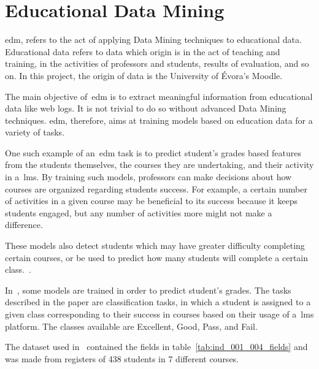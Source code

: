 \section{Educational Data Mining}

\acrfull{edm}, refers to the act of applying Data Mining techniques to
educational data. Educational data refers to data which origin is in the act of
teaching and training, in the activities of professors and students, results of
evaluation, and so on. In this project, the origin of data is the University of
Évora's Moodle.

The main objective of~\gls{edm} is to extract meaningful information from
educational data like web logs. It is not trivial to do so without advanced
Data Mining techniques. \gls{edm}, therefore, aims at training models based on
education data for a variety of tasks.

One such example of an~\gls{edm} task is to predict student's grades based
features from the students themselves, the courses they are undertaking, and
their activity in a~\gls{lms}. By training such models, professors can make
decisions about how courses are organized regarding students success. For
example, a certain number of activities in a given course may be beneficial to
its success because it keeps students engaged, but any number of activities
more might not make a difference.~\cite{ind_001, ind_002, ind_005}

These models also detect students which may have greater difficulty completing
certain courses, or be used to predict how many students will complete a
certain class.~\cite{ind_007, ind_008}.

In~\cite{ind_001}, some models are trained in order to predict student's
grades.  The tasks described in the paper are classification tasks, in which a
student is assigned to a given class corresponding to their success in courses
based on their usage of a~\gls{lms} platform. The classes available are
Excellent, Good, Pass, and Fail.

The dataset used in~\cite{ind_001} contained the fields in
table~\ref{tab:ind_001_004_fields} and was made from registers of 438 students
in 7 different courses.

